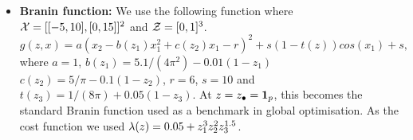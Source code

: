 \begin{itemize}[leftmargin=0.0in]
\item[]
\textbf{Branin function:}
We use the following function where $\mathcal{X}=[[-5, 10], [0, 15]]^2$ and $\mathcal{Z}=[0,1]^3$.
\[
g(z,x) = a(x_2 - b(z_1)x_1^2 + c(z_2)x_1 - r)^2 + s(1-t(z))cos(x_1) + s,
\]
where $a = 1$, $b(z_1)=5.1/(4\pi^2) - 0.01(1-z_1)$
$c(z_2) = 5/\pi - 0.1(1-z_2)$, $r=6$, $s=10$ and $t(z_3)=1/(8\pi) + 0.05(1-z_3)$.
At $z=z_{\bullet} = {\bf 1}_p$, this becomes the standard Branin function used as a benchmark in
global optimisation.
As the cost function we used $\lambda(z) = 0.05 + z_1^{3}z_2^{2}z_3^{1.5}$.


\end{itemize}





